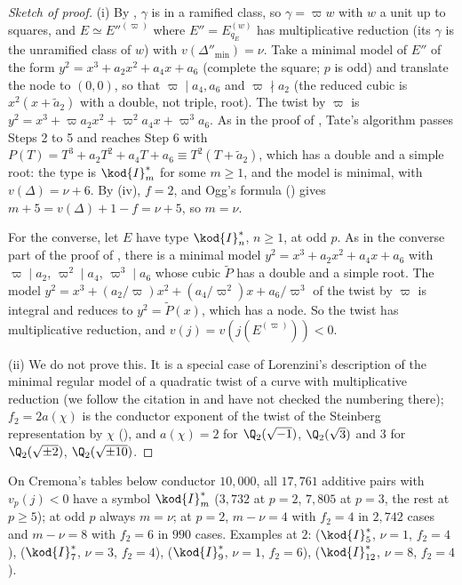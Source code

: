 \begin{proof}[Sketch of proof]
(i) By , $\gamma$ is in a ramified class, so $\gamma=\varpi w$ with $w$ a unit up to squares, and
$E\simeq E''^{(\varpi)}$ where $E''=E_{q_E}^{(w)}$ has multiplicative reduction (its $\gamma$ is the unramified class of $w$) with
$v(\Delta''_{\min})=\nu$. Take a minimal model of $E''$ of the form $y^2=x^3+a_2x^2+a_4x+a_6$ (complete the square; $p$ is odd) and
translate the node to $(0,0)$, so that $\varpi\mid a_4,a_6$ and $\varpi\nmid a_2$ (the reduced cubic is $x^2(x+\tilde a_2)$ with a double, not
triple, root). The twist by $\varpi$ is $y^2=x^3+\varpi a_2x^2+\varpi^2a_4x+\varpi^3a_6$. As in the proof of
, Tate's algorithm passes Steps 2 to 5 and reaches Step 6 with
$P(T)=T^3+a_2T^2+a_4T+a_6\equiv T^2(T+\tilde a_2)$, which has a double and a simple root: the type is $\kod{I}_m^*$ for some $m\ge1$, and
the model is minimal, with $v(\Delta)=\nu+6$. By (iv), $f=2$, and Ogg's formula
() gives $m+5=v(\Delta)+1-f=\nu+5$, so $m=\nu$.

For the converse, let $E$ have type $\kod{I}_n^*$, $n\ge1$, at odd $p$. As in the converse part of the proof of
, there is a minimal model $y^2=x^3+a_2x^2+a_4x+a_6$ with $\varpi\mid a_2$, $\varpi^2\mid a_4$, $\varpi^3\mid a_6$
whose cubic $\tilde P$ has a double and a simple root. The model $y^2=x^3+(a_2/\varpi)x^2+(a_4/\varpi^2)x+a_6/\varpi^3$ of the twist by $\varpi$
is integral and reduces to $y^2=\tilde P(x)$, which has a node. So the twist has multiplicative reduction, and
$v(j)=v(j(E^{(\varpi)}))<0$.

(ii) We do not prove this. It is a special case of Lorenzini's description of the minimal regular model of a quadratic twist of a
curve with multiplicative reduction \cite{Lorenzini10} (we follow the citation in \cite{Praveen26} and have not checked the
numbering there); $f_2=2a(\chi)$ is the conductor exponent of the twist of the Steinberg representation by $\chi$
(), and $a(\chi)=2$ for $\Q_2(\sqrt{-1})$, $\Q_2(\sqrt{3})$ and $3$ for $\Q_2(\sqrt{\pm2})$, $\Q_2(\sqrt{\pm10})$.
\end{proof}

On Cremona's tables below conductor $10{,}000$, all $17{,}761$ additive pairs with $v_p(j)<0$ have a symbol $\kod{I}_m^*$
($3{,}732$ at $p=2$, $7{,}805$ at $p=3$, the rest at $p\ge5$); at odd $p$ always $m=\nu$; at $p=2$, $m-\nu=4$ with $f_2=4$ in
$2{,}742$ cases and $m-\nu=8$ with $f_2=6$ in $990$ cases. Examples at $2$:  ($\kod{I}_5^*$, $\nu=1$, $f_2=4$),
 ($\kod{I}_7^*$, $\nu=3$, $f_2=4$),  ($\kod{I}_9^*$, $\nu=1$, $f_2=6$),  ($\kod{I}_{12}^*$, $\nu=8$,
$f_2=4$).

